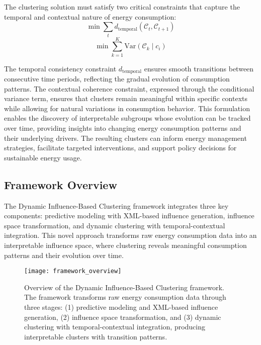 \documentclass[final,5p,times,twocolumn,numbers]{elsarticle}
\begin{document}
The clustering solution must satisfy two critical constraints that capture the temporal and contextual nature of energy consumption:
\begin{equation}
    \min \sum_{t} d_{\text{temporal}}(\mathcal{C}_{t}, \mathcal{C}_{t+1})
\end{equation}
\begin{equation}
    \min \sum_{k=1}^K \text{Var}(\mathcal{C}_k \mid c_i)
\end{equation}

The temporal consistency constraint $d_{\text{temporal}}$ ensures smooth transitions between consecutive time periods, reflecting the gradual evolution of consumption patterns. The contextual coherence constraint, expressed through the conditional variance term, ensures that clusters remain meaningful within specific contexts while allowing for natural variations in consumption behavior.
This formulation enables the discovery of interpretable subgroups whose evolution can be tracked over time, providing insights into changing energy consumption patterns and their underlying drivers. The resulting clusters can inform energy management strategies, facilitate targeted interventions, and support policy decisions for sustainable energy usage.

\subsection{Framework Overview}
The Dynamic Influence-Based Clustering framework integrates three key components: predictive modeling with XML-based influence generation, influence space transformation, and dynamic clustering with temporal-contextual integration. This novel approach transforms raw energy consumption data into an interpretable influence space, where clustering reveals meaningful consumption patterns and their evolution over time.

\begin{figure}[t]
\centering
\texttt{[image: framework\_overview]}
\caption{Overview of the Dynamic Influence-Based Clustering framework. The framework transforms raw energy consumption data through three stages: (1) predictive modeling and XML-based influence generation, (2) influence space transformation, and (3) dynamic clustering with temporal-contextual integration, producing interpretable clusters with transition patterns.}
\label{framework_overview}
\end{figure}
\end{document}
